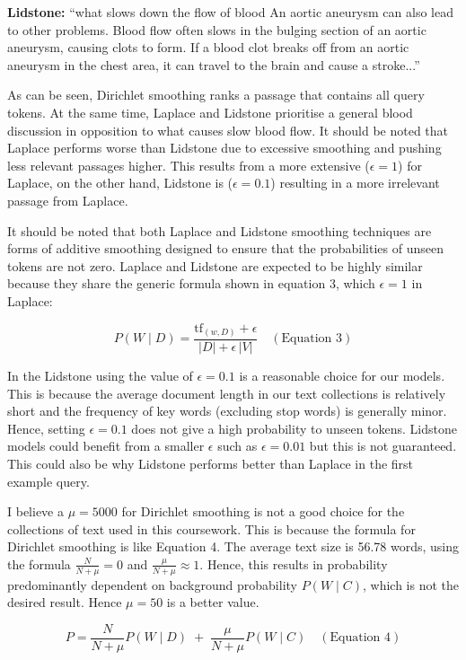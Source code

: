 \documentclass[10pt]{article}
\begin{document}
\noindent
\textbf{Lidstone:} ``what slows down the flow of blood \quad An aortic aneurysm can also lead to other problems. Blood flow often slows in the bulging section of an aortic aneurysm, causing clots to form. If a blood clot breaks off from an aortic aneurysm in the chest area, it can travel to the brain and cause a stroke...''

As can be seen, Dirichlet smoothing ranks a passage that contains all query tokens. At the same time, Laplace and Lidstone prioritise a general blood discussion in opposition to what causes slow blood flow. It should be noted that Laplace performs worse than Lidstone due to excessive smoothing and pushing less relevant passages higher. This results from a more extensive (\(\epsilon = 1\)) for Laplace, on the other hand, Lidstone is (\(\epsilon = 0.1\)) resulting in a more irrelevant passage from Laplace.

It should be noted that both Laplace and Lidstone smoothing techniques are forms of additive smoothing designed to ensure that the probabilities of unseen tokens are not zero. Laplace and Lidstone are expected to be highly similar because they share the generic formula shown in equation 3, which \(\epsilon=1\) in Laplace:

\[
P(W \mid D) = \frac{\mathrm{tf}_{(w,D)} + \epsilon}{|D| + \epsilon \, |V|} \quad (\text{Equation 3})
\]

In the Lidstone using the value of \(\epsilon=0.1\) is a reasonable choice for our models. This is because the average document length in our text collections is relatively short and the frequency of key words (excluding stop words) is generally minor. Hence, setting \(\epsilon=0.1\) does not give a high probability to unseen tokens. Lidstone models could benefit from a smaller \(\epsilon\) such as \(\epsilon=0.01\) but this is not guaranteed. This could also be why Lidstone performs better than Laplace in the first example query.

I believe a \(\mu = 5000\) for Dirichlet smoothing is not a good choice for the collections of text used in this coursework. This is because the formula for Dirichlet smoothing is like Equation 4. The average text size is 56.78 words, using the formula \( \frac{N}{N+\mu} = 0\) and \(\frac{\mu}{N+\mu} \approx 1\). Hence, this results in probability predominantly dependent on background probability \(P(W \mid C)\), which is not the desired result. Hence \(\mu=50\) is a better value.

\[
P = \frac{N}{N + \mu} P(W \mid D) \;+\; \frac{\mu}{N + \mu} P(W \mid C) \quad (\text{Equation 4})
\]
\end{document}
